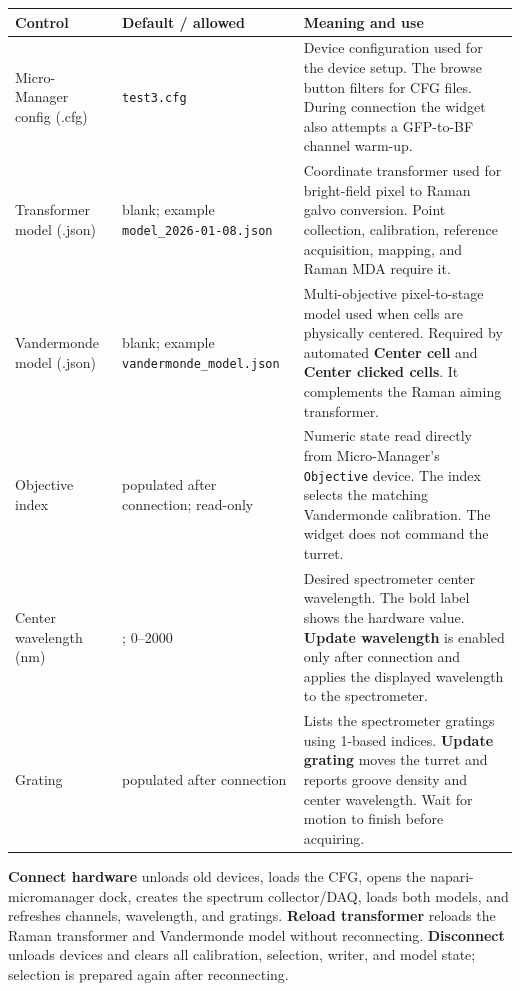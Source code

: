 \documentclass[11pt,oneside]{report}
\makeatletter
\newcommand{\ui}[1]{\textbf{#1}}
\newcommand{\code}[1]{\texttt{#1}}
\newcommand{\fieldtable}{\begin{longtable}{@{}>{\raggedright\arraybackslash}p{0.25\textwidth}>{\raggedright\arraybackslash}p{0.18\textwidth}>{\raggedright\arraybackslash}p{0.50\textwidth}@{}}\toprule\textbf{Control} & \textbf{Default / allowed} & \textbf{Meaning and use}\\\midrule\endhead}
\newcommand{\endfieldtable}{\bottomrule\end{longtable}}
\makeatother
\begin{document}
\fieldtable
Micro-Manager config (.cfg) & \code{test3.cfg} & Device configuration used for
the device setup. The browse button filters for CFG files. During
connection the widget also attempts a GFP-to-BF channel warm-up.\\
Transformer model (.json) & blank; example \code{model\_2026-01-08.json} &
Coordinate transformer used for bright-field pixel to Raman galvo conversion.
Point collection, calibration, reference acquisition, mapping, and Raman MDA require it.\\
Vandermonde model (.json) & blank; example \code{vandermonde\_model.json} &
Multi-objective pixel-to-stage model used when cells are physically centered.
Required by automated \ui{Center cell} and \ui{Center clicked cells}. It
complements the Raman aiming transformer.\\
Objective index & populated after connection; read-only & Numeric state read
directly from Micro-Manager's \code{Objective} device. The index selects the
matching Vandermonde calibration. The widget does not command the turret.\\
Center wavelength (nm) & 785.00; 0--2000 & Desired spectrometer center wavelength.
The bold label shows the hardware value. \ui{Update wavelength} is enabled only after
connection and applies the displayed wavelength to the spectrometer.\\
Grating & populated after connection & Lists the spectrometer gratings using 1-based
indices. \ui{Update grating} moves the turret and reports groove density and center
wavelength. Wait for motion to finish before acquiring.\\
\endfieldtable

\ui{Connect hardware} unloads old devices, loads the CFG, opens the
napari-micromanager dock, creates the spectrum collector/DAQ, loads both models,
and refreshes channels, wavelength, and gratings. \ui{Reload transformer} reloads
the Raman transformer and Vandermonde model without reconnecting. \ui{Disconnect}
unloads devices and clears all calibration, selection, writer, and model state;
selection is prepared again after reconnecting.
\end{document}
